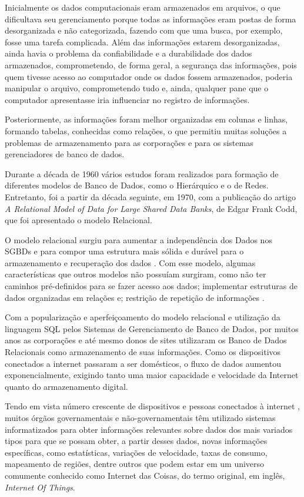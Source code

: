 Inicialmente os dados computacionais eram armazenados em arquivos\cite{Kotaro-2005}, o que dificultava seu gerenciamento porque todas as informações eram postas de forma desorganizada e não categorizada, fazendo com que uma busca, por exemplo, fosse uma tarefa complicada. Além das informações estarem desorganizadas, ainda havia o problema da confiabilidade e a durabilidade dos dados armazenados, comprometendo, de forma geral, a segurança das informações, pois quem tivesse acesso ao computador onde os dados fossem armazenados, poderia manipular o arquivo, comprometendo tudo e, ainda, qualquer pane que o computador apresentasse iria influenciar no registro de informações\cite{Kotaro-2005}.

Posteriormente, as informações foram melhor organizadas em colunas e linhas, formando tabelas, conhecidas como relações, o que permitiu muitas soluções a problemas de armazenamento para as corporações e para os sistemas gerenciadores de banco de dados\cite{C.Date}.

Durante a década de 1960 vários estudos foram realizados para formação de diferentes modelos de Banco de Dados, como o Hierárquico e o de Redes. Entretanto, foi a partir da década seguinte, em 1970, com a publicação do artigo \textit{A Relational Model of Data for Large Shared Data Banks}, de Edgar Frank Codd, que foi apresentado o modelo Relacional\cite{C.Date}.

O modelo relacional surgiu para aumentar a independência dos Dados nos SGBDs e para compor uma estrutura mais sólida e durável para o armazenamento e recuperação dos dados \cite{Kotaro-2005}. Com esse modelo, algumas características que outros modelos não possuíam surgiram, como não ter caminhos pré-definidos para se fazer acesso aos dados; implementar estruturas de dados organizadas em relações e; restrição de repetição de informações \cite{Kotaro-2005}.

Com a popularização e aperfeiçoamento do modelo relacional e utilização da linguagem SQL pelos Sistemas de Gerenciamento de Banco de Dados, por muitos anos as corporações e até mesmo donos de sites utilizaram os Banco de Dados Relacionais como armazenamento de suas informações\cite{Taurion-big-data}. Como os dispositivos conectados a internet passaram a ser domésticos, o fluxo de dados aumentou exponencialmente, exigindo tanto uma maior capacidade e velocidade da Internet quanto do armazenamento digital\cite{Taurion-big-data}.

Tendo em vista número crescente de dispositivos e pessoas conectados à internet \cite{IBGE-2018}, muitos órgãos governamentais e não-governamentais têm utilizado sistemas informatizados para obter informações relevantes sobre dados dos mais variados tipos para que se possam obter, a partir desses dados, novas informações específicas, como estatísticas, variações de velocidade, taxas de consumo, mapeamento de regiões, dentre outros que podem estar em um universo comumente conhecido como Internet das Coisas, do termo original, em inglês, \textit{Internet Of Things}\cite{Magrani-2018}.

